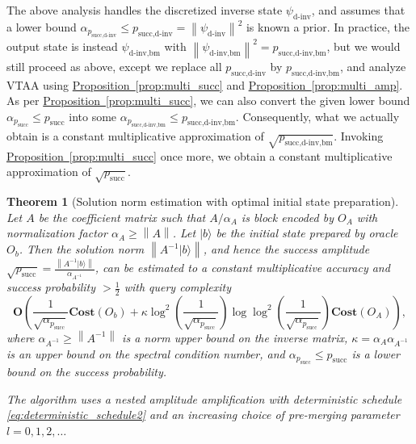 \documentclass[letterpaper,onecolumn,11pt,accepted=2026-02-14]{quantumarticle}
\newcommand{\norm}[1]{\left\lVert#1\right\rVert}
\newtheorem{theorem}{Theorem}
\theoremstyle{remark}
\theoremstyle{plain}
\newcommand{\eq}[1]{\cref{eq:#1}}
\newcommand{\prop}[1]{\hyperref[prop:#1]{Proposition~\ref*{prop:#1}}}
\newcommand{\ket}[1]{|#1\rangle}
\begin{document}
The above analysis handles the discretized inverse state $\psi_{\text{d-inv}}$, and assumes that a lower bound $\alpha_{p_{\text{succ,d-inv}}}\leq p_{\text{succ,d-inv}}=\norm{\psi_{\text{d-inv}}}^2$ is known a prior. 
In practice, the output state is instead $\psi_{\text{d-inv,bm}}$ with $\norm{\psi_{\text{d-inv,bm}}}^2=p_{\text{succ,d-inv,bm}}$, but we would still proceed as above, except we replace all $p_{\text{succ,d-inv}}$ by $p_{\text{succ,d-inv,bm}}$, and analyze VTAA using \prop{multi_succ} and \prop{multi_amp}.
As per \prop{multi_succ}, we can also convert the given lower bound $\alpha_{p_{\text{succ}}}\leq p_{\text{succ}}$ into some $\alpha_{p_{\text{succ,d-inv,bm}}}\leq p_{\text{succ,d-inv,bm}}$.
Consequently, what we actually obtain is a constant multiplicative approximation of $\sqrt{p_{\text{succ,d-inv,bm}}}$. Invoking \prop{multi_succ} once more, we obtain a constant multiplicative approximation of $\sqrt{p_{\text{succ}}}$.

\begin{theorem}[Solution norm estimation with optimal initial state preparation]
\label{thm:sol_est}
Let $A$ be the coefficient matrix such that $A/\alpha_A$ is block encoded by $O_A$ with normalization factor $\alpha_A\geq\norm{A}$. Let $\ket{b}$ be the initial state prepared by oracle $O_b$.
Then the solution norm $\norm{A^{-1}\ket{b}}$, and hence the success amplitude $\sqrt{p_{\text{succ}}}=\frac{\norm{A^{-1}\ket{b}}}{\alpha_{A^{-1}}}$, can be estimated to a constant multiplicative accuracy and success probability $>\frac{1}{2}$ with query complexity
\begin{equation}
    \mathbf{O}\left(\frac{1}{\sqrt{\alpha_{p_{\text{succ}}}}}\mathbf{Cost}(O_b)
    +\kappa\log^2\left(\frac{1}{\sqrt{\alpha_{p_{\text{succ}}}}}\right)\log\log^2\left(\frac{1}{\sqrt{\alpha_{p_{\text{succ}}}}}\right)\mathbf{Cost}(O_A)\right),
\end{equation}
where $\alpha_{A^{-1}}\geq\norm{A^{-1}}$ is a norm upper bound on the inverse matrix, $\kappa=\alpha_A\alpha_{A^{-1}}$ is an upper bound on the spectral condition number, and $\alpha_{p_{\text{succ}}}\leq p_{\text{succ}}$ is a lower bound on the success probability.

The algorithm uses a nested amplitude amplification with deterministic schedule \eq{deterministic_schedule2} and an increasing choice of pre-merging parameter $l=0,1,2,\ldots$
\end{theorem}

\end{document}
